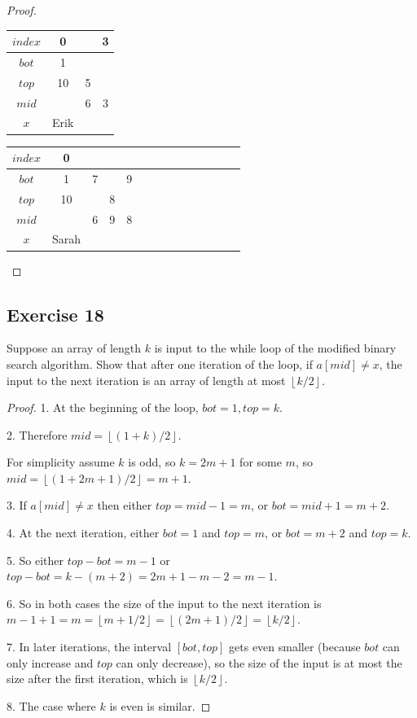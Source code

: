 \documentclass[14pt]{extarticle}
\newcommand{\floor}[1]{{\left\lfloor#1\right\rfloor}}
\begin{document}
\begin{proof}
    \begin{tabular}{|c|c|c|c|}
        \hline
        \(index\) & 0    &   & 3 \\
        \hline
        \(bot\)   & 1    &   &   \\
        \hline
        \(top\)   & 10   & 5 &   \\
        \hline
        \(mid\)   &      & 6 & 3 \\
        \hline
        \(x\)     & Erik &   &   \\
        \hline
    \end{tabular}
    \begin{tabular}{|c|c|c|c|c|c|c|c|c|c|c|c|c|c|}
        \hline
        \(index\) & 0     &   &   &   \\
        \hline
        \(bot\)   & 1     & 7 &   & 9 \\
        \hline
        \(top\)   & 10    &   & 8 &   \\
        \hline
        \(mid\)   &       & 6 & 9 & 8 \\
        \hline
        \(x\)     & Sarah &   &   &   \\
        \hline
    \end{tabular}
\end{proof}

\subsection{Exercise 18}
Suppose an array of length \(k\) is input to the while loop of the modified binary search algorithm. Show that after one
iteration of the loop, if \(a[mid] \neq x\), the input to the next iteration is an array of length at most \(\floor{k/2}\).

\begin{proof}
    1. At the beginning of the loop, \(bot = 1, top = k\).

    2. Therefore \(mid = \floor{(1+k)/2}\).

    For simplicity assume \(k\) is odd, so \(k = 2m+1\) for some \(m\), so \(mid = \floor{(1+2m+1)/2} = m+1\).

    3. If \(a[mid] \neq x\) then either \(top = mid - 1 = m\), or \(bot = mid + 1 = m+2\).

    4. At the next iteration, either \(bot = 1\) and \(top = m\), or \(bot = m+2\) and \(top = k\).

    5. So either \(top - bot = m - 1\) or \(top - bot = k - (m+2) = 2m+1 - m - 2 = m-1\).

    6. So in both cases the size of the input to the next iteration is \(m-1+1 = m = \floor{m + 1/2} = \floor{(2m+1)/2}
    = \floor{k/2}\).

    7. In later iterations, the interval \([bot, top]\) gets even smaller (because \(bot\) can only increase and \(top\) can
    only decrease), so the size of the input is at most the size after the first iteration, which is \(\floor{k/2}\).

    8. The case where \(k\) is even is similar.
\end{proof}
\end{document}
